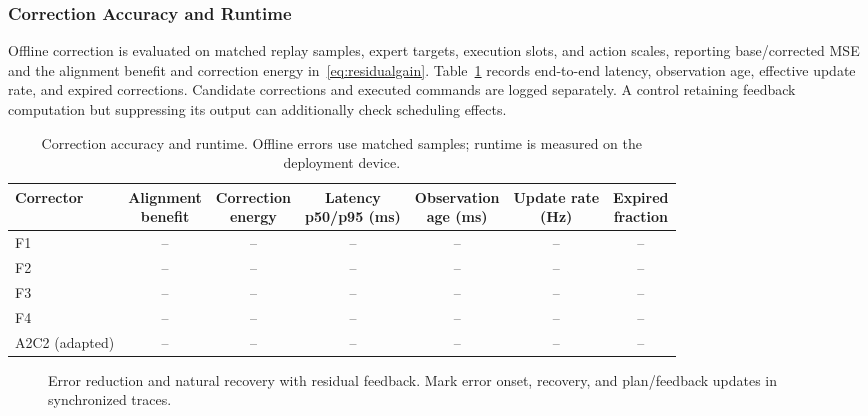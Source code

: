 \subsubsection{Correction Accuracy and Runtime}
Offline correction is evaluated on matched replay samples, expert targets, execution slots, and action scales, reporting base/corrected MSE and the alignment benefit and correction energy in~\eqref{eq:residualgain}.
Table~\ref{tab:feedbackruntime} records end-to-end latency, observation age, effective update rate, and expired corrections.
Candidate corrections and executed commands are logged separately.
A control retaining feedback computation but suppressing its output can additionally check scheduling effects.

\begin{table}[!t]
\caption{Correction accuracy and runtime. Offline errors use matched samples; runtime is measured on the deployment device.}
\label{tab:feedbackruntime}
\centering\small
\setlength{\tabcolsep}{5pt}
\begin{tabular}{lcccccc}
\toprule
Corrector & \shortstack{Alignment\\benefit} & \shortstack{Correction\\energy} & \shortstack{Latency\\p50/p95 (ms)} & \shortstack{Observation\\age (ms)} & \shortstack{Update rate\\(Hz)} & \shortstack{Expired\\fraction}\\
\midrule
F1 & -- & -- & -- & -- & -- & --\\
F2 & -- & -- & -- & -- & -- & --\\
F3 & -- & -- & -- & -- & -- & --\\
F4 & -- & -- & -- & -- & -- & --\\
A2C2 (adapted) & -- & -- & -- & -- & -- & --\\
\bottomrule
\end{tabular}
\end{table}

\begin{figure}[!t]
\centering
\caption{Error reduction and natural recovery with residual feedback. Mark error onset, recovery, and plan/feedback updates in synchronized traces.}
\label{fig:feedbackrecovery}
\end{figure}

